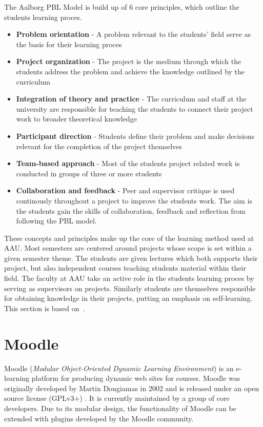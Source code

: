 The Aalborg PBL Model is build up of 6 core principles, which outline the students learning proces.
\begin{itemize}
	\item \textbf{Problem orientation} - A problem relevant to the students' field serve as the basis for their learning proces
	\item \textbf{Project organization} - The project is the medium through which the students address the problem and achieve the knowledge outlined by the curriculum
	\item \textbf{Integration of theory and practice} - The curriculum and staff at the university are responsible for teaching the students to connect their project work to broader theoretical knowledge
	\item \textbf{Participant direction} - Students define their problem and make decisions relevant for the completion of the project themselves
	\item \textbf{Team-based approach} - Most of the students project related work is conducted in groups of three or more students
	\item \textbf{Collaboration and feedback} - Peer and supervisor critique is used continously throughout a project to improve the students work. The aim is the students gain the skills of collaboration, feedback and reflection from following the PBL model. 
\end{itemize}

These concepts and principles make up the core of the learning method used at AAU. Most semesters are centered around projects whose scope is set within a given semester theme. The students are given lectures which both supports their project, but also independent courses teaching students material within their field. The faculty at AAU take an active role in the students learning proces by serving as supervisors on projects. Similarly students are themselves responsible for obtaining knowledge in their projects, putting an emphasis on self-learning. This section is based on~\citep{Barge10}.

\section{Moodle}
Moodle (\emph{Modular Object-Oriented Dynamic Learning Environment}) \citep{moodle} is an e-learning platform for producing dynamic web sites for courses. Moodle was originally developed by Martin Dougiamas in 2002 and is released under an open source license (GPLv3+) \citep{gpl}. It is currently maintained by a group of core developers. Due to its modular design, the functionality of Moodle can be extended with plugins developed by the Moodle community.

